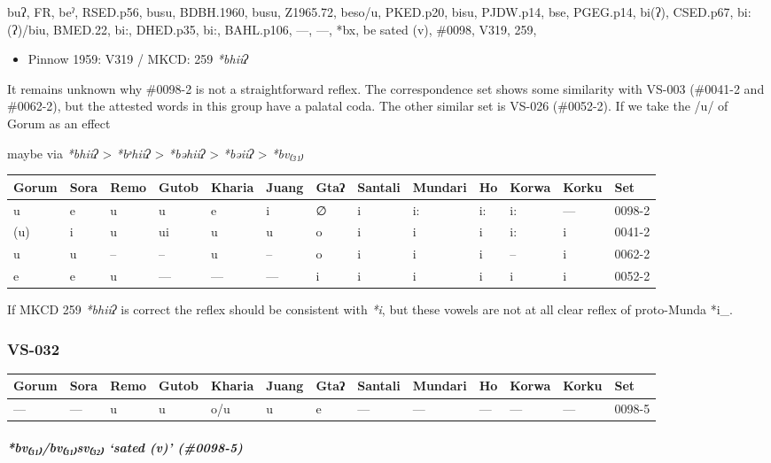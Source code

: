 \documentclass[a4paper,]{article}
\providecommand{\tightlist}{%
  \setlength{\itemsep}{0pt}\setlength{\parskip}{0pt}}
\let\oldsubparagraph\subparagraph
\renewcommand{\subparagraph}[1]{\oldsubparagraph{#1}\mbox{}}
\begin{document}
buʔ, FR, beˀ, RSED.p56, busu, BDBH.1960, busu, Z1965.72, beso/u,
PKED.p20, bisu, PJDW.p14, bse, PGEG.p14, bi(ʔ), CSED.p67, bi:(ʔ)/biu,
BMED.22, bi:, DHED.p35, bi:, BAHL.p106, ---, ---, *bx, be sated (v),
\#0098, V319, 259,

\begin{itemize}
\tightlist
\item
  Pinnow 1959: V319 / MKCD: 259 \emph{*bhiiʔ}
\end{itemize}

It remains unknown why \#0098-2 is not a straightforward reflex. The
correspondence set shows some similarity with VS-003 (\#0041-2 and
\#0062-2), but the attested words in this group have a palatal coda. The
other similar set is VS-026 (\#0052-2). If we take the /u/ of Gorum as
an effect

maybe via \emph{*bhiiʔ} \textgreater{} \emph{*bᵊhiiʔ} \textgreater{}
\emph{*bəhiiʔ} \textgreater{} \emph{*bəiiʔ} \textgreater{}
\emph{*bv₍₃₁₎}

\begin{longtable}[]{@{}lllllllllllll@{}}
\toprule
Gorum & Sora & Remo & Gutob & Kharia & Juang & Gtaʔ & Santali & Mundari
& Ho & Korwa & Korku & Set\tabularnewline
\midrule
\endhead
u & e & u & u & e & i & ∅ & i & i: & i: & i: & --- &
0098-2\tabularnewline
(u) & i & u & ui & u & u & o & i & i & i & i: & i &
0041-2\tabularnewline
u & u & -- & -- & u & -- & o & i & i & i & -- & i &
0062-2\tabularnewline
e & e & u & --- & --- & --- & i & i & i & i & i & i &
0052-2\tabularnewline
\bottomrule
\end{longtable}

If MKCD 259 \emph{*bhiiʔ} is correct the reflex should be consistent
with \emph{*i}, but these vowels are not at all clear reflex of
proto-Munda *i\_.

\subsubsection{VS-032}\label{vs-032}

\begin{longtable}[]{@{}lllllllllllll@{}}
\toprule
Gorum & Sora & Remo & Gutob & Kharia & Juang & Gtaʔ & Santali & Mundari
& Ho & Korwa & Korku & Set\tabularnewline
\midrule
\endhead
--- & --- & u & u & o/u & u & e & --- & --- & --- & --- & --- &
0098-5\tabularnewline
\bottomrule
\end{longtable}

\subparagraph{\texorpdfstring{\emph{*bv₍₃₁₎/bv₍₃₁₎sv₍₃₂₎} `sated (v)'
(\#0098-5)}{*bv₍₃₁₎/bv₍₃₁₎sv₍₃₂₎ sated (v) (\#0098-5)}}\label{bvbvsv-sated-v-0098-5}
\end{document}

